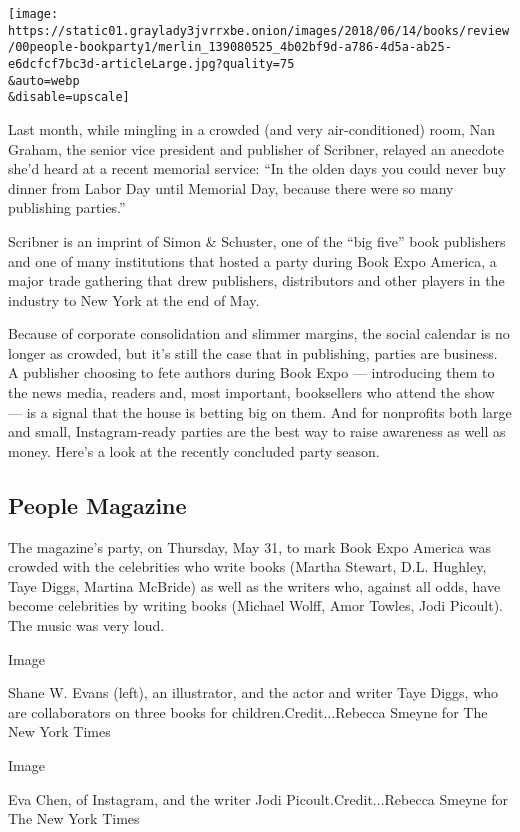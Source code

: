 \texttt{[image: https://static01.graylady3jvrrxbe.onion/images/2018/06/14/books/review/00people-bookparty1/merlin\_139080525\_4b02bf9d-a786-4d5a-ab25-e6dcfcf7bc3d-articleLarge.jpg?quality=75\\\&auto=webp\\\&disable=upscale]}

Last month, while mingling in a crowded (and very air-conditioned) room,
Nan Graham, the senior vice president and publisher of Scribner, relayed
an anecdote she'd heard at a recent memorial service: ``In the olden
days you could never buy dinner from Labor Day until Memorial Day,
because there were so many publishing parties.''

Scribner is an imprint of Simon \& Schuster, one of the ``big five''
book publishers and one of many institutions that hosted a party during
Book Expo America, a major trade gathering that drew publishers,
distributors and other players in the industry to New York at the end of
May.

Because of corporate consolidation and slimmer margins, the social
calendar is no longer as crowded, but it's still the case that in
publishing, parties are business. A publisher choosing to fete authors
during Book Expo --- introducing them to the news media, readers and,
most important, booksellers who attend the show --- is a signal that the
house is betting big on them. And for nonprofits both large and small,
Instagram-ready parties are the best way to raise awareness as well as
money. Here's a look at the recently concluded party season.

\hypertarget{people-magazine}{%
\subsection{People Magazine}\label{people-magazine}}

The magazine's party, on Thursday, May 31, to mark Book Expo America was
crowded with the celebrities who write books (Martha Stewart, D.L.
Hughley, Taye Diggs, Martina McBride) as well as the writers who,
against all odds, have become celebrities by writing books (Michael
Wolff, Amor Towles, Jodi Picoult). The music was very loud.

Image

Shane W. Evans (left), an illustrator, and the actor and writer Taye
Diggs, who are collaborators on three books for
children.Credit...Rebecca Smeyne for The New York Times

Image

Eva Chen, of Instagram, and the writer Jodi Picoult.Credit...Rebecca
Smeyne for The New York Times

